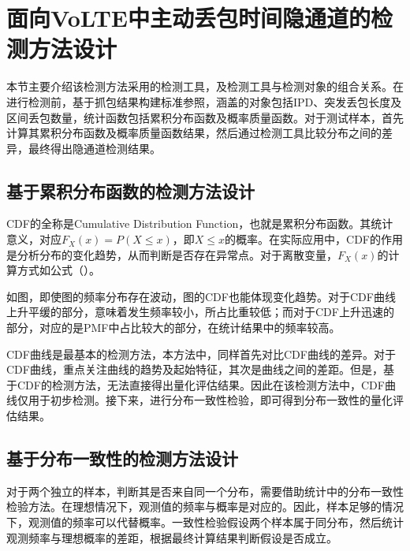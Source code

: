 \section{面向VoLTE中主动丢包时间隐通道的检测方法设计}
\label{chap:analyze:statistical}

本节主要介绍该检测方法采用的检测工具，及检测工具与检测对象的组合关系。在进行检测前，基于抓包结果构建标准参照，涵盖的对象包括IPD、突发丢包长度及区间丢包数量，统计函数包括累积分布函数及概率质量函数。对于测试样本，首先计算其累积分布函数及概率质量函数结果，然后通过检测工具比较分布之间的差异，最终得出隐通道检测结果。

\subsection{基于累积分布函数的检测方法设计}
\label{chap:analyze:statistical:cdf}

CDF的全称是Cumulative Distribution Function，也就是累积分布函数。其统计意义，对应$F_{X}(x)=P (X\leq x)$，即$X\leq x$的概率。在实际应用中，CDF的作用是分析分布的变化趋势，从而判断是否存在异常点。对于离散变量，$F_{X}(x)$的计算方式如公式（）。


如图，即使图的频率分布存在波动，图的CDF也能体现变化趋势。对于CDF曲线上升平缓的部分，意味着发生频率较小，所占比重较低；而对于CDF上升迅速的部分，对应的是PMF中占比较大的部分，在统计结果中的频率较高。

CDF曲线是最基本的检测方法，本方法中，同样首先对比CDF曲线的差异。对于CDF曲线，重点关注曲线的趋势及起始特征，其次是曲线之间的差距。但是，基于CDF的检测方法，无法直接得出量化评估结果。因此在该检测方法中，CDF曲线仅用于初步检测。接下来，进行分布一致性检验，即可得到分布一致性的量化评估结果。

\subsection{基于分布一致性的检测方法设计}
\label{chap:analyze:statistical:test}

对于两个独立的样本，判断其是否来自同一个分布，需要借助统计中的分布一致性检验方法。在理想情况下，观测值的频率与概率是对应的。因此，样本足够的情况下，观测值的频率可以代替概率。一致性检验假设两个样本属于同分布，然后统计观测频率与理想概率的差距，根据最终计算结果判断假设是否成立。

